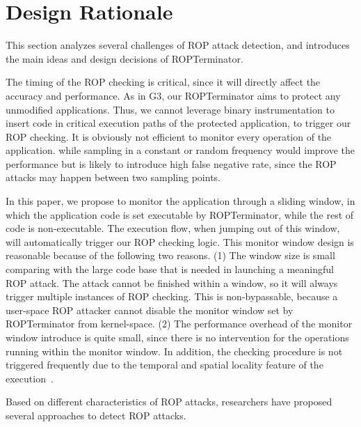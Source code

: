 \section{Design Rationale}\label{sec:rationale}

This section analyzes several challenges of ROP attack detection, and introduces the main ideas and design decisions of ROPTerminator.

The timing of the ROP checking is critical, since it will directly affect the accuracy and performance.
As in G3, our ROPTerminator aims to protect any unmodified applications. Thus, we cannot leverage binary instrumentation to insert code in critical execution paths of the protected application, to trigger our ROP checking. It is obviously not efficient to monitor every operation of the application. while sampling in a constant or random frequency would improve the performance but is likely to introduce high false negative rate, since the ROP attacks may happen between two sampling points. %

In this paper, we propose to monitor the application through a sliding window, in which the application code is set executable by ROPTerminator,
while the rest of code is non-executable. The execution flow, when jumping out of this window, will automatically trigger our ROP checking logic.
This monitor window design is reasonable because of the following two reasons. (1) The window size is small comparing with the large code base that is needed in launching a meaningful ROP attack. The attack cannot be finished within a window, so it will always trigger multiple instances of ROP checking. This is non-bypassable, because a user-space ROP attacker cannot disable the monitor window set by ROPTerminator from kernel-space.
(2) The performance overhead of the monitor window introduce is quite small, since there is no intervention for the operations running within the monitor window. In addition, the checking procedure is not triggered frequently due to the temporal and spatial locality feature of the execution~\cite{ulk}.


Based on different characteristics of ROP attacks, researchers have proposed several approaches to detect ROP attacks.

